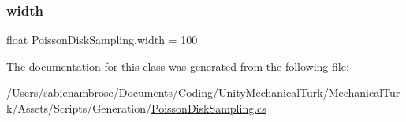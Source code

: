 \mbox{\label{class_poisson_disk_sampling_a0b32f3e1950036797fb17575da924b8e}} 
\subsubsection{\texorpdfstring{width}{width}}
{\footnotesize\ttfamily float Poisson\+Disk\+Sampling.\+width = 100}



The documentation for this class was generated from the following file\+:\begin{DoxyCompactItemize}
\item 
/\+Users/sabienambrose/\+Documents/\+Coding/\+Unity\+Mechanical\+Turk/\+Mechanical\+Turk/\+Assets/\+Scripts/\+Generation/\mbox{\hyperlink{_poisson_disk_sampling_8cs}{Poisson\+Disk\+Sampling.\+cs}}\end{DoxyCompactItemize}
